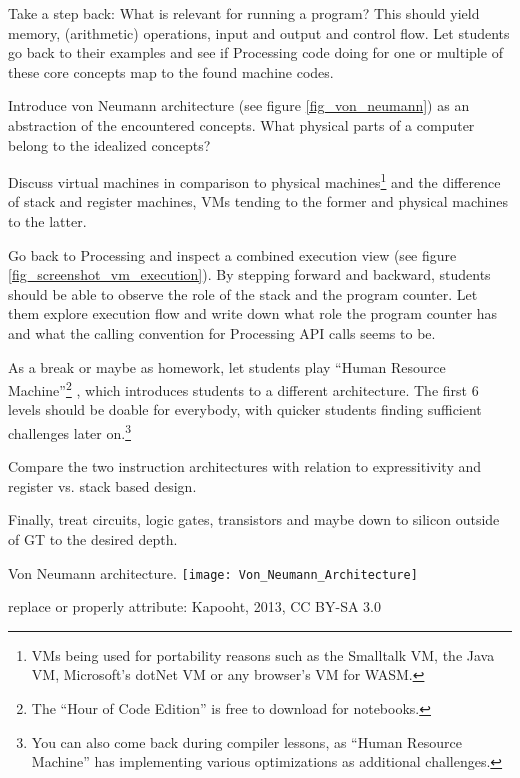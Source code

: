 \begin{instructions}
\item Take a step back: What is relevant for running a program? This should yield memory, (arithmetic) operations, input and output and control flow. Let students go back to their examples and see if Processing code doing for one or multiple of these core concepts map to the found machine codes.
\item Introduce von Neumann architecture (see figure \ref{fig_von_neumann}) as an abstraction of the encountered concepts. What physical parts of a computer belong to the idealized concepts?
\item Discuss virtual machines in comparison to physical machines\footnote{VMs being used for portability reasons such as the Smalltalk VM, the Java VM, Microsoft's dotNet VM or any browser's VM for WASM.} and the difference of stack and register machines, VMs tending to the former and physical machines to the latter.
\item Go back to Processing and inspect a combined execution view (see figure \ref{fig_screenshot_vm_execution}). By stepping forward and backward, students should be able to observe the role of the stack and the program counter. Let them explore execution flow and write down what role the program counter has and what the calling convention for Processing API calls seems to be.
\item As a break or maybe as homework, let students play ``Human Resource Machine''\footnote{The ``Hour of Code Edition'' is free to download for notebooks.} \cite{Tom15}, which introduces students to a different architecture. The first 6 levels should be doable for everybody, with quicker students finding sufficient challenges later on.\footnote{You can also come back during compiler lessons, as ``Human Resource Machine'' has implementing various optimizations as additional challenges.}
\item Compare the two instruction architectures with relation to expressitivity and register vs. stack based design.

\item Finally, treat circuits, logic gates, transistors and maybe down to silicon outside of GT to the desired depth.
\end{instructions}

\begin{cfigure}{Von Neumann architecture.}
\texttt{[image: Von\_Neumann\_Architecture]}
\begin{todo}
\item replace or properly attribute: Kapooht, 2013, CC BY-SA 3.0
\end{todo}
\end{cfigure}

